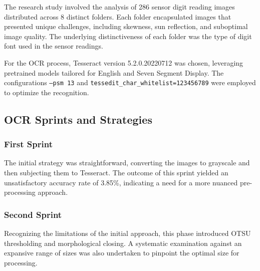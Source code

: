 The research study involved the analysis of 286 sensor digit reading images distributed across 8 distinct folders. Each folder encapsulated images that presented unique challenges, including skewness, sun reflection, and suboptimal image quality. The underlying distinctiveness of each folder was the type of digit font used in the sensor readings.

For the OCR process, Tesseract version 5.2.0.20220712 was chosen, leveraging pretrained models tailored for English and Seven Segment Display. The configurations \texttt{--psm 13} and \texttt{tessedit\_char\_whitelist=123456789} were employed to optimize the recognition.

\subsection{OCR Sprints and Strategies}

\subsubsection{First Sprint}
The initial strategy was straightforward, converting the images to grayscale and then subjecting them to Tesseract. The outcome of this sprint yielded an unsatisfactory accuracy rate of 3.85\%, indicating a need for a more nuanced pre-processing approach.

\subsubsection{Second Sprint}
Recognizing the limitations of the initial approach, this phase introduced OTSU thresholding and morphological closing. A systematic examination against an expansive range of sizes was also undertaken to pinpoint the optimal size for processing.

